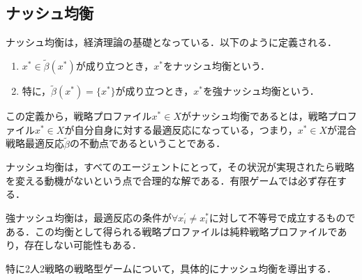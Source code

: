 \documentclass{jsreport}
\begin{document}
\subsection{ナッシュ均衡}
ナッシュ均衡は，経済理論の基礎となっている．以下のように定義される．
\begin{screen}
  \begin{defi}[ナッシュ均衡]
    \begin{enumerate}
      \item $x^{*} \in \tilde{\beta}(x^{*})$が成り立つとき，$x^{*}$をナッシュ均衡という．
      \item 特に，$\tilde{\beta}(x^{*}) = \{x^{*}\}$が成り立つとき，$x^{*}$を強ナッシュ均衡という．
    \end{enumerate}
  \end{defi}
\end{screen}

この定義から，戦略プロファイル$x^{*} \in X$がナッシュ均衡であるとは，戦略プロファイル$x^{*} \in X$が自分自身に対する最適反応になっている，つまり，$x^{*} \in X$が混合戦略最適反応$\tilde{\beta}$の不動点であるということである．

ナッシュ均衡は，すべてのエージェントにとって，その状況が実現されたら戦略を変える動機がないという点で合理的な解である．有限ゲームでは必ず存在する．

強ナッシュ均衡は，最適反応の条件が$\forall x_i^{\prime} \neq x_i^{*}$に対して不等号で成立するものである．この均衡として得られる戦略プロファイルは純粋戦略プロファイルであり，存在しない可能性もある．

特に2人2戦略の戦略型ゲームについて，具体的にナッシュ均衡を導出する．
\end{document}
